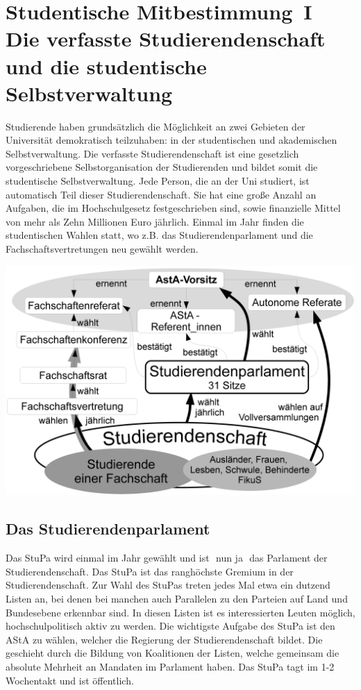 \section[Studentische Mitbestimmung]{Studentische Mitbestimmung~I\\Die verfasste Studierendenschaft und die studentische Selbstverwaltung}
\label{studmit}
\begin{multicols*}{2}
Studierende haben grundsätzlich die Möglichkeit an zwei Gebieten der Universität demokratisch teilzuhaben: in der studentischen und akademischen Selbstverwaltung.
Die verfasste Studierendenschaft ist eine gesetzlich vorgeschriebene Selbstorganisation der Studierenden und bildet somit die studentische Selbstverwaltung. Jede Person, die an der Uni studiert, ist automatisch Teil dieser Studierendenschaft. Sie hat eine große Anzahl an Aufgaben, die im Hochschulgesetz festgeschrieben sind, sowie finanzielle Mittel von mehr als Zehn Millionen Euro jährlich. 
Einmal im Jahr finden die studentischen Wahlen statt, wo z.B. das Studierendenparlament und die Fachschaftsvertretungen neu gewählt werden. 



\bigskip
\includegraphics[width=\columnwidth]{res/verfasste_studierendenschaft.png}
\bigskip


\subsection{Das Studierendenparlament}
Das StuPa wird einmal im Jahr gewählt und ist  nun ja  das Parlament der Studierendenschaft. Das StuPa ist das ranghöchste Gremium in der Studierendenschaft. Zur Wahl des StuPas treten jedes Mal etwa ein dutzend Listen an, bei denen bei manchen auch Parallelen zu den Parteien auf Land und Bundesebene erkennbar sind. In diesen Listen ist es interessierten Leuten möglich, hochschulpolitisch aktiv zu werden. 
Die wichtigste Aufgabe des StuPa ist den AStA zu wählen, welcher die Regierung der Studierendenschaft bildet. Die geschieht durch die Bildung von Koalitionen der Listen, welche gemeinsam die absolute Mehrheit an Mandaten im Parlament haben. Das StuPa tagt im 1-2 Wochentakt und ist öffentlich. 



\end{multicols*}
